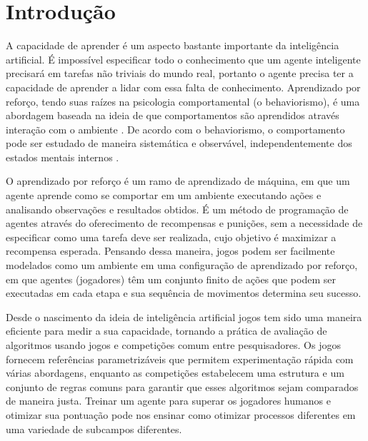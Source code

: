\chapter{Introdução}
\label{cap:intro}

A capacidade de aprender é um aspecto bastante importante da inteligência artificial. É impossível especificar todo o conhecimento que um agente inteligente precisará em tarefas não triviais do mundo real, portanto o agente precisa ter a capacidade de aprender a lidar com essa falta de conhecimento. Aprendizado por reforço, tendo suas raízes na psicologia comportamental (o behaviorismo), é uma abordagem baseada na ideia de que comportamentos são aprendidos através interação com o ambiente \cite{krapfl}. De acordo com o behaviorismo, o comportamento pode ser estudado de maneira sistemática e observável, independentemente dos estados mentais internos \cite{abramson}.

O aprendizado por reforço é um ramo de aprendizado de máquina, em que um agente aprende como se comportar em um ambiente executando ações e analisando observações e resultados obtidos. É um método de programação de agentes através do oferecimento de recompensas e punições, sem a necessidade de especificar como uma tarefa deve ser realizada, cujo objetivo é maximizar a recompensa esperada. Pensando dessa maneira, jogos podem ser facilmente modelados como um ambiente em uma configuração de aprendizado por reforço, em que agentes (jogadores) têm um conjunto finito de ações que podem ser executadas em cada etapa e sua sequência de movimentos determina seu sucesso. 

Desde o nascimento da ideia de inteligência artificial jogos tem sido uma maneira eficiente para medir a sua capacidade, tornando a prática de avaliação de algoritmos usando jogos e competições comum entre pesquisadores. Os jogos fornecem referências parametrizáveis que permitem experimentação rápida com várias abordagens, enquanto as competições estabelecem uma estrutura e um conjunto de regras comuns para garantir que esses algoritmos sejam comparados de maneira justa. Treinar um agente para superar os jogadores humanos \cite{silver16} e otimizar sua pontuação pode nos ensinar como otimizar processos diferentes em uma variedade de subcampos diferentes. 

